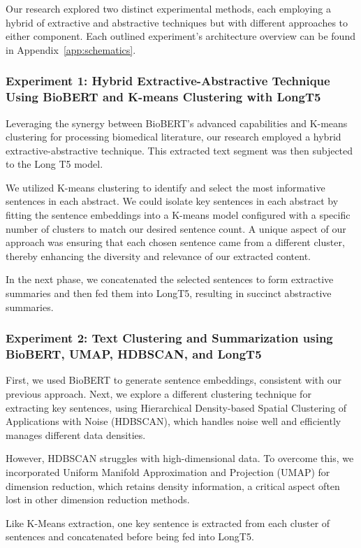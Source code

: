 \documentclass[11pt]{article}
\begin{document}
Our research explored two distinct experimental methods, each employing a hybrid of extractive and abstractive techniques but with different approaches to either component. Each outlined experiment’s architecture overview can be found in Appendix~\ref{app:schematics}.

\subsubsection{Experiment 1: Hybrid Extractive-Abstractive Technique Using BioBERT and K-means Clustering with LongT5}
\label{exp:1}
Leveraging the synergy between BioBERT's advanced capabilities and K-means clustering for processing biomedical literature, our research employed a hybrid extractive-abstractive technique. This extracted text segment was then subjected to the Long T5 model.

We utilized K-means clustering to identify and select the most informative sentences in each abstract. We could isolate key sentences in each abstract by fitting the sentence embeddings into a K-means model configured with a specific number of clusters to match our desired sentence count. A unique aspect of our approach was ensuring that each chosen sentence came from a different cluster, thereby enhancing the diversity and relevance of our extracted content.

In the next phase, we concatenated the selected sentences to form extractive summaries and then fed them into LongT5, resulting in succinct abstractive summaries.

\subsubsection{Experiment 2: Text Clustering and Summarization using BioBERT, UMAP, HDBSCAN, and LongT5}
First, we used BioBERT to generate sentence embeddings, consistent with our previous approach. Next, we explore a different clustering technique for extracting key sentences, using Hierarchical Density-based Spatial Clustering of Applications with Noise (HDBSCAN)\cite{asyaky2021hdbscan}, which handles noise well and efficiently manages different data densities.

However, HDBSCAN struggles with high-dimensional data. To overcome this, we incorporated Uniform Manifold Approximation and Projection (UMAP) for dimension reduction, which retains density information, a critical aspect often lost in other dimension reduction methods.

Like K-Means extraction, one key sentence is extracted from each cluster of sentences and concatenated before being fed into LongT5.
\end{document}
